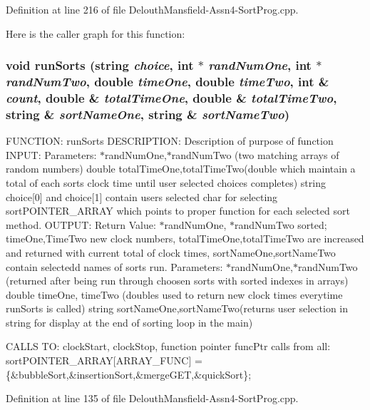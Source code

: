 Definition at line 216 of file DelouthMansfield-\/Assn4-\/SortProg.cpp.



Here is the caller graph for this function:

\hypertarget{_delouth_mansfield-_assn4-_sort_prog_8cpp_acd0f7b42076b153145b2198ffad4a0c2}{
\subsubsection[{runSorts}]{\setlength{\rightskip}{0pt plus 5cm}void runSorts (string {\em choice}, \/  int $\ast$ {\em randNumOne}, \/  int $\ast$ {\em randNumTwo}, \/  double {\em timeOne}, \/  double {\em timeTwo}, \/  int \& {\em count}, \/  double \& {\em totalTimeOne}, \/  double \& {\em totalTimeTwo}, \/  string \& {\em sortNameOne}, \/  string \& {\em sortNameTwo})}}
\label{_delouth_mansfield-_assn4-_sort_prog_8cpp_acd0f7b42076b153145b2198ffad4a0c2}
FUNCTION: runSorts DESCRIPTION: Description of purpose of function INPUT: Parameters: $\ast$randNumOne,$\ast$randNumTwo (two matching arrays of random numbers) double totalTimeOne,totalTimeTwo(double which maintain a total of each sorts clock time until user selected choices completes) string choice\mbox{[}0\mbox{]} and choice\mbox{[}1\mbox{]} contain users selected char for selecting sortPOINTER\_\-ARRAY which points to proper function for each selected sort method. OUTPUT: Return Value: $\ast$randNumOne, $\ast$randNumTwo sorted; timeOne,TimeTwo new clock numbers, totalTimeOne,totalTimeTwo are increased and returned with current total of clock times, sortNameOne,sortNameTwo contain selectedd names of sorts run. Parameters: $\ast$randNumOne,$\ast$randNumTwo (returned after being run through choosen sorts with sorted indexes in arrays) double timeOne, timeTwo (doubles used to return new clock times everytime runSorts is called) string sortNameOne,sortNameTwo(returns user selection in string for display at the end of sorting loop in the main)

CALLS TO: clockStart, clockStop, function pointer funcPtr calls from all: sortPOINTER\_\-ARRAY\mbox{[}ARRAY\_\-FUNC\mbox{]} = \{\&bubbleSort,\&insertionSort,\&mergeGET,\&quickSort\}; 

Definition at line 135 of file DelouthMansfield-\/Assn4-\/SortProg.cpp.



